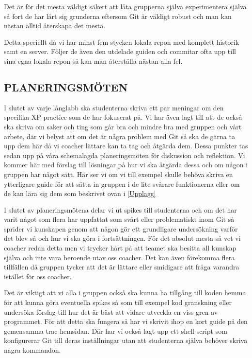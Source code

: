 Det är för det mesta väldigt säkert att låta grupperna själva experimentera själva så fort de har lärt sig grunderna eftersom Git är väldigt robust och man kan nästan alltid återskapa det mesta.

Detta speciellt då vi har minst fem stycken lokala repon med komplett historik samt en server. Följer de även den utdelade guiden och commitar ofta upp till sina egna lokala repon så kan man återställa nästan alla fel.

\subsection{PLANERINGSMÖTEN}

I slutet av varje långlabb ska studenterna skriva ett par meningar om den specifika XP practice som de har fokuserat på. Vi har även lagt till att de också ska skriva om saker och ting som går bra och mindre bra med gruppen och vårt arbete, där vi belyst att om det är några problem med Git så ska de gärna ta upp dem här då vi coacher lättare kan ta tag och åtgärda dem. Dessa punkter tas sedan upp på våra schemalagda planeringsmöten för diskussion och reflektion. Vi kommer här med förslag till lösningar på hur vi ska åtgärda dessa och om någon i gruppen har något sätt. Här ser vi om vi till exempel skulle behöva skriva en ytterligare guide för att sätta in gruppen i de lite svårare funktionerna eller om de kan lära sig dem som beskrivet ovan i \ref{Upplagg} 

I slutet av planeringsmötena delar vi ut spikes till studenterna och om det har varit något som flera har uppfattat som svårt eller problematiskt inom Git så sprider vi kunskapen genom att någon gör ett grundligare undersökning varför det blev så och hur vi ska göra i fortsättningen. För det absolut mesta så vet vi coacher redan detta men  vi trycker hårt på att teamet ska besitta all kunskap själva och inte vara beroende utav oss coacher. Det kan även förekomma flera tillfällen då gruppen tycker att det är lättare eller smidigare att fråga varandra istället för oss coacher.

Det är viktigt att vi alla i gruppen också ska kunna ha tillgång till koden hemma för att kunna göra eventuella spikes så som till exempel kod granskning eller undersöka förslag till hur det är bäst att vidare utveckla en viss gren av programmet. För att detta ska fungera så har vi skrivit ihop en kort guide på den gemensamma trac-hemsidan. Där har vi också lagt upp ett shell-script som konfigurerar Git till deras inställningar utan att studenterna själva behöver skriva några kommandon.

